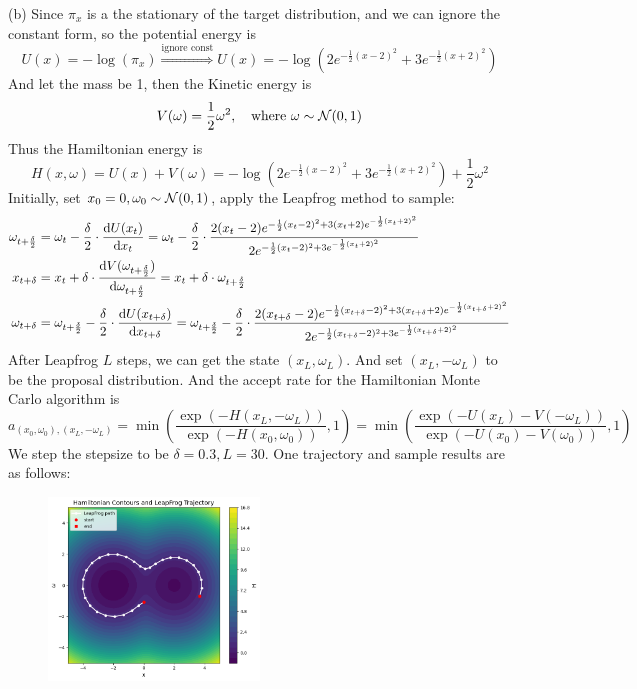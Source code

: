 \begin{homeworkProblem}
(b) Since $\pi_x$ is a the stationary of the target distribution, and we can ignore the constant form, so the potential energy is
$$U(x)=-\log(\pi_x) \stackrel{\text{ignore const}}{\Rightarrow} U(x)= -\log\left(2e^{-\frac{1}{2}(x-2)^2} + 3e^{-\frac{1}{2}(x+2)^2}\right)$$
And let the mass be 1, then the Kinetic energy is
$$V(\omega)=\dfrac{1}{2}\omega^2, \quad\text{where } \omega\sim\mathcal{N}(0,1)$$
Thus the Hamiltonian energy is
$$H(x,\omega)=U(x)+V(\omega)= -\log\left(2e^{-\frac{1}{2}(x-2)^2} + 3e^{-\frac{1}{2}(x+2)^2}\right)+\dfrac{1}{2}\omega^2$$
Initially, set $x_0=0, \omega_0\sim\mathcal{N}(0,1)$, apply the Leapfrog method to sample:
\begin{align*}
\omega_{t+\frac{\delta}{2}} &= \omega_t - \frac{\delta}{2}\cdot \dfrac{\mathrm{d}U(x_t)}{\mathrm{d}x_t} = \omega_t - \frac{\delta}{2}\cdot \dfrac{2(x_t-2)e^{-\frac{1}{2}(x_t-2)^2+3(x_t+2)e^{-\frac{1}{2}(x_t+2)^2}}}{2e^{-\frac{1}{2}(x_t-2)^2+3e^{-\frac{1}{2}(x_t+2)^2}}} \\
x_{t+\delta} &= x_t + \delta \cdot \dfrac{\mathrm{d}V(\omega_{t+\frac{\delta}{2}})}{\mathrm{d}\omega_{t+\frac{\delta}{2}}} = x_t + \delta\cdot \omega_{t+\frac{\delta}{2}} \\
\omega_{t+\delta} &= \omega_{t+\frac{\delta}{2}} - \frac{\delta}{2}\cdot \dfrac{\mathrm{d}U(x_{t+\delta})}{\mathrm{d}x_{t+\delta}} = \omega_{t+\frac{\delta}{2}} - \frac{\delta}{2}\cdot \dfrac{2(x_{t+\delta}-2)e^{-\frac{1}{2}(x_{t+\delta}-2)^2+3(x_{t+\delta}+2)e^{-\frac{1}{2}(x_{t+\delta}+2)^2}}}{2e^{-\frac{1}{2}(x_{t+\delta}-2)^2+3e^{-\frac{1}{2}(x_{t+\delta}+2)^2}}}
\end{align*}
After Leapfrog $L$ steps, we can get the state $(x_L, \omega_L)$. And set $(x_L, -\omega_L)$ to be the proposal distribution. And the accept rate for the Hamiltonian Monte Carlo algorithm is
$$a_{(x_0,\omega_0),(x_L,-\omega_L)}=\min\left(\dfrac{\exp\left(-H(x_L,-\omega_L)\right)}{\exp\left(-H(x_0,\omega_0)\right)}, 1\right)=\min\left(\dfrac{\exp\left(-U(x_L)-V(-\omega_L)\right)}{\exp\left(-U(x_0)-V(\omega_0)\right)}, 1\right)$$
We step the stepsize to be $\delta=0.3, L=30$. One trajectory and sample results are as follows:
\begin{figure}[h]
    \centering
    \includegraphics[width=0.5\textwidth]{./figure/p11/trajectory.png}

\end{figure}
\end{homeworkProblem}

